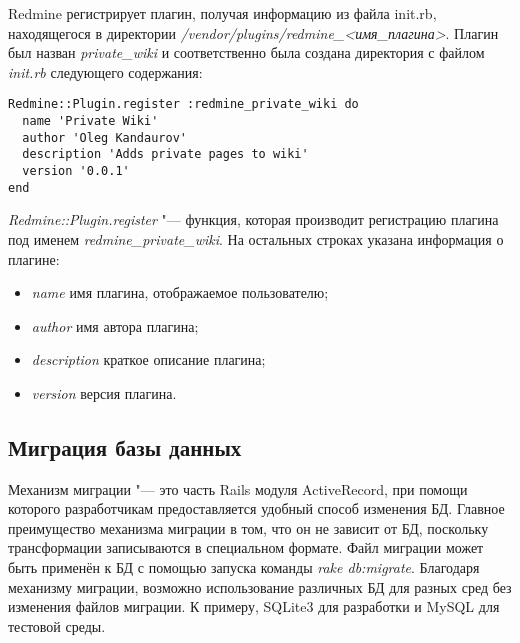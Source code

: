 Redmine регистрирует плагин, получая информацию из файла init.rb, находящегося
в директории \textit{/vendor/plugins/redmine\_<имя\_плагина>}. Плагин был
назван \textit{private\_wiki} и соответственно была создана директория с файлом
\textit{init.rb} следующего содержания:
\small{\begin{lstlisting}
Redmine::Plugin.register :redmine_private_wiki do
  name 'Private Wiki'
  author 'Oleg Kandaurov'
  description 'Adds private pages to wiki'
  version '0.0.1'
end
\end{lstlisting}}
\textit{Redmine::Plugin.register} "--- функция, которая производит регистрацию
плагина под именем \textit{redmine\_private\_wiki}. На остальных строках
указана информация о плагине:
\begin{itemize} 
  \item \textit{name} имя плагина, отображаемое пользователю;
  \item \textit{author} имя автора плагина;
  \item \textit{description} краткое описание плагина;
  \item \textit{version} версия плагина.
\end{itemize}

\subsection{Миграция базы данных} 
\label{section:migration}
Механизм миграции "--- это часть Rails модуля ActiveRecord, при помощи которого
разработчикам предоставляется удобный способ изменения БД. Главное преимущество
механизма миграции в том, что он не зависит от БД, поскольку трансформации
записываются в специальном формате. Файл миграции может быть применён к БД с
помощью запуска команды \textit{rake db:migrate}. Благодаря механизму миграции,
возможно использование различных БД для разных сред без изменения файлов
миграции. К примеру, SQLite3 для разработки и MySQL для тестовой среды.

